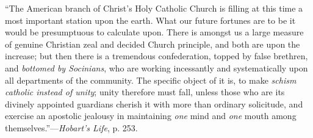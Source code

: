 ``The
American branch of Christ's Holy Catholic Church is filling at this
time a most important station upon the earth. What our future fortunes
are to be it would be presumptuous to calculate upon. There is amongst
us a large measure of genuine Christian zeal and decided Church
principle, and both are upon the increase; but then there is a
tremendous confederation, topped by false brethren, and \emph{bottomed by
Socinians}, who are working incessantly and systematically upon all
departments of the community. The specific object of it is, to make \emph{schism
catholic instead of unity}; unity therefore must fall, unless those
who are its divinely appointed guardians
cherish it with more than ordinary solicitude, and exercise an
apostolic jealousy in maintaining \emph{one} mind and \emph{one} mouth
among themselves.''—\emph{Hobart's Life}, p. 253.

